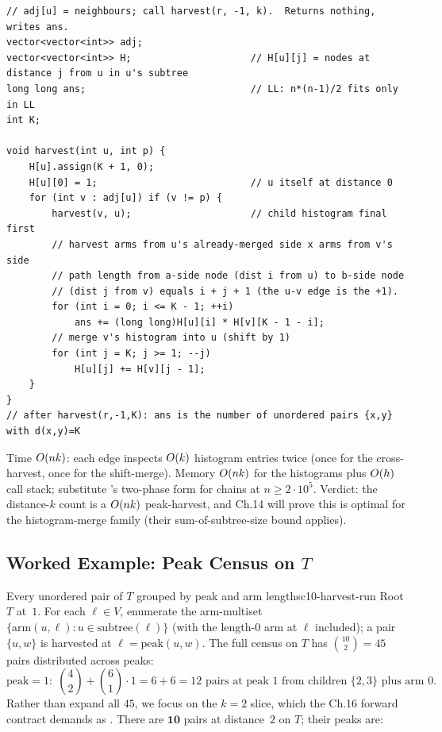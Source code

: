 \begin{lstlisting}[caption={Harvest at the peak: per-node arm histogram merged child-by-child; CF 161D's distance-k instance}, label={lst:c10-peak}]
// adj[u] = neighbours; call harvest(r, -1, k).  Returns nothing, writes ans.
vector<vector<int>> adj;
vector<vector<int>> H;                     // H[u][j] = nodes at distance j from u in u's subtree
long long ans;                             // LL: n*(n-1)/2 fits only in LL
int K;

void harvest(int u, int p) {
    H[u].assign(K + 1, 0);
    H[u][0] = 1;                           // u itself at distance 0
    for (int v : adj[u]) if (v != p) {
        harvest(v, u);                     // child histogram final first
        // harvest arms from u's already-merged side x arms from v's side
        // path length from a-side node (dist i from u) to b-side node
        // (dist j from v) equals i + j + 1 (the u-v edge is the +1).
        for (int i = 0; i <= K - 1; ++i)
            ans += (long long)H[u][i] * H[v][K - 1 - i];
        // merge v's histogram into u (shift by 1)
        for (int j = K; j >= 1; --j)
            H[u][j] += H[v][j - 1];
    }
}
// after harvest(r,-1,K): ans is the number of unordered pairs {x,y} with d(x,y)=K
\end{lstlisting}

\begin{complexitybox}
Time $O(nk)$: each edge inspects $O(k)$ histogram entries twice
(once for the cross-harvest, once for the shift-merge). Memory $O(nk)$
for the histograms plus $O(h)$ call stack; substitute 's
two-phase form for chains at $n\ge 2\cdot 10^{5}$. Verdict: the distance-$k$
count is a $O(nk)$ peak-harvest, and Ch.14 will prove this is optimal
for the histogram-merge family (their sum-of-subtree-size bound applies).
\end{complexitybox}

\subsection{Worked Example: Peak Census on $T$}

\begin{example}{Every unordered pair of $T$ grouped by peak and arm lengths}{c10-harvest-run}
Root $T$ at~$1$. For each $\ell\in V$, enumerate the arm-multiset
$\{\mathrm{arm}(u,\ell):u\in\text{subtree}(\ell)\}$ (with the length-$0$ arm at
$\ell$ included); a pair $\{u,w\}$ is harvested at $\ell=
\mathrm{peak}(u,w)$. The full census on $T$ has $\binom{10}{2}=45$ pairs
distributed across peaks:
\[
  \text{peak}=1:\; \textstyle\binom{4}{2}+\textstyle\binom{6}{1}\!\cdot\!1 = 6+6 = 12 \text{ pairs at peak }1\text{ from children }\{2,3\}\text{ plus arm }0.
\]
Rather than expand all $45$, we focus on the $k=2$ slice, which the
Ch.16 forward contract demands as . There are $\mathbf{10}$
pairs at distance~$2$ on $T$; their peaks are:
\end{example}

